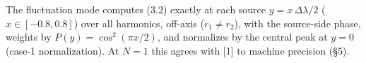 \documentclass[
]{article}
\begin{document}
The fluctuation mode computes (3.2) exactly at each source
\(y=x\,\Delta\lambda/2\) (\(x\in[-0.8,0.8]\)) over all harmonics,
off-axis (\(r_1\neq r_2\)), with the source-side phase, weights by
\(P(y)=\cos^2(\pi x/2)\), and normalizes by the central peak at \(y=0\)
(case-1 normalization). At \(N=1\) this agrees with {[}1{]} to machine
precision (§5).
\end{document}
